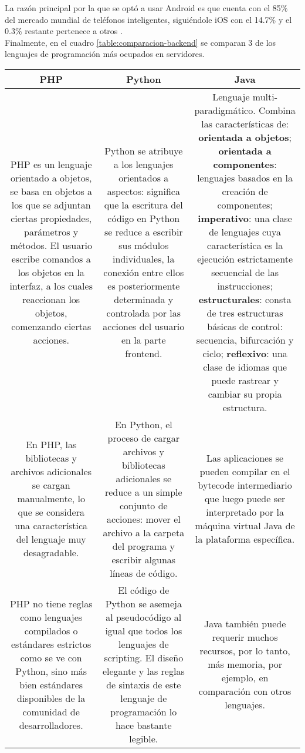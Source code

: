 La razón principal por la que se optó a usar Android es que cuenta con el 85\% del mercado mundial de teléfonos inteligentes, siguiéndole iOS con el 14.7\% y el 0.3\% restante pertenece a otros \cite{MBAND}.  \\

Finalmente, en el cuadro \ref{table:comparacion-backend} se comparan 3 de los lenguajes de programación más ocupados en servidores.

\FloatBarrier
\begin{table}[htb]
\setlength\extrarowheight{2pt} %
\begin{tabularx}{\textwidth}{|C|C|C|}
\hline
\textbf{PHP} & \textbf{Python} & \textbf{Java} 
\\ \hline
PHP es un lenguaje orientado a objetos, se basa en objetos a los que se adjuntan ciertas propiedades, parámetros y métodos. El usuario escribe comandos a los objetos en la interfaz, a los cuales reaccionan los objetos, comenzando ciertas acciones. & Python se atribuye a los lenguajes orientados a aspectos: significa que la escritura del código en Python se reduce a escribir sus módulos individuales, la conexión entre ellos es posteriormente determinada y controlada por las acciones del usuario en la parte frontend. & Lenguaje multi-paradigmático. Combina las características de: \textbf{orientada a objetos}; \textbf{orientada a componentes}: lenguajes basados en la creación de componentes; \textbf{imperativo}: una clase de lenguajes cuya característica es la ejecución estrictamente secuencial de las instrucciones; \textbf{estructurales}: consta de tres estructuras básicas de control: secuencia, bifurcación y ciclo; \textbf{reflexivo}: una clase de idiomas que puede rastrear y cambiar su propia estructura.
\\ \hline
En PHP, las bibliotecas y archivos adicionales se cargan manualmente, lo que se considera una característica del lenguaje muy desagradable. & En Python, el proceso de cargar archivos y bibliotecas adicionales se reduce a un simple conjunto de acciones: mover el archivo a la carpeta del programa y escribir algunas líneas de código.  &  Las aplicaciones se pueden compilar en el bytecode intermediario que luego puede ser interpretado por la máquina virtual Java de la plataforma específica.
\\ \hline
PHP no tiene reglas como lenguajes compilados o estándares estrictos como se ve con Python, sino más bien estándares disponibles de la comunidad de desarrolladores. & El código de Python se asemeja al pseudocódigo al igual que todos los lenguajes de scripting. El diseño elegante y las reglas de sintaxis de este lenguaje de programación lo hace bastante legible.  &  Java también puede requerir muchos recursos, por lo tanto, más memoria, por ejemplo, en comparación con otros lenguajes.

\end{tabularx}
\end{table}
